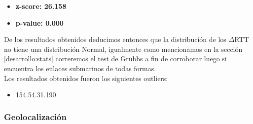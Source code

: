 \begin{itemize}
\item \textbf{z-score: 26.158}
\item \textbf{p-value: 0.000}
\end{itemize}

De los resultados obtenidos deducimos entonces que la distribución de los $\Delta$RTT no tiene una distribución Normal, igualmente como mencionamos en la sección \ref{desarrollo:stats} correremos el test de Grubbs a fin de corroborar luego si encuentra los enlaces submarinos de todas formas.\\
Los resultados obtenidos fueron los siguientes outliers:

\begin{itemize}
\item 154.54.31.190
\end{itemize}


\subsubsection{Geolocalización}

